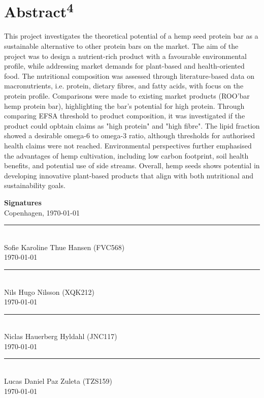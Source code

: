 \section*{Abstract\textsuperscript{4}}
This project investigates the theoretical potential of a hemp seed protein bar as a sustainable alternative to other protein bars on the market. The aim of the project was to design a nutrient-rich product with a favourable environmental profile, while addressing market demands for plant-based and health-oriented food. The nutritional composition was assessed through literature-based data on macronutrients, i.e. protein, dietary fibres, and fatty acids, with focus on the protein profile. Comparisons were made to existing market products (ROO'bar hemp protein bar), highlighting the bar's potential for high protein. Through comparing EFSA threshold to product composition, it was investigated if the product could opbtain claims as "high protein" and "high fibre". The lipid fraction showed a desirable omega-6 to omega-3 ratio, although thresholds for authorised health claims were not reached. Environmental perspectives further emphasised the advantages of hemp cultivation, including low carbon footprint, soil health benefits, and potential use of side streams. Overall, hemp seeds shows potential in developing innovative plant-based products that align with both nutritional and sustainability goals.


\vspace{2em}
\begin{center}
    \textbf{Signatures}\\[0.5em]
    {\small Copenhagen, \today}
    \end{center}
    
    \vspace{2.5em}
    
    \noindent
    \begin{minipage}[t]{0.48\textwidth}
      \rule{\linewidth}{0.4pt}\\[-0.2em]
      Sofie Karoline Thue Hansen (FVC568)\\
      {\small \today}
    \end{minipage}\hfill
    \begin{minipage}[t]{0.48\textwidth}
      \rule{\linewidth}{0.4pt}\\[-0.2em]
      Nils Hugo Nilsson (XQK212)\\
      {\small \today}
    \end{minipage}
    
    \vspace{7em}
    
    \noindent
    \begin{minipage}[t]{0.48\textwidth}
      \rule{\linewidth}{0.4pt}\\[-0.2em]
      Niclas Hauerberg Hyldahl (JNC117)\\
      {\small \today}
    \end{minipage}\hfill
    \begin{minipage}[t]{0.48\textwidth}
      \rule{\linewidth}{0.4pt}\\[-0.2em]
      Lucas Daniel Paz Zuleta (TZS159)\\
      {\small \today}
    \end{minipage}